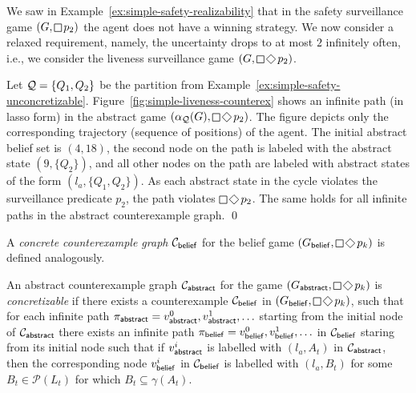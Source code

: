 \begin{example}\label{ex:simple-liveness-counterex}
We saw in Example~\ref{ex:simple-safety-realizability} that in the safety surveillance game $(G,\LTLglobally p_2)$ the agent does not have a winning strategy. %
We now consider a relaxed requirement, namely, the uncertainty drops to at most $2$ infinitely often, i.e., we consider the liveness surveillance game 
$(G,\LTLglobally \LTLfinally p_2)$.

Let $\mathcal{Q} = \{Q_1,Q_2\}$ be the partition from Example~\ref{ex:simple-safety-unconcretizable}. %
Figure~\ref{fig:simple-liveness-counterex} shows an infinite path (in lasso form) in the abstract game $(\alpha_\part(G),\LTLglobally \LTLfinally p_2)$.  The figure depicts only the corresponding trajectory (sequence of positions) of the agent. The initial abstract belief set is $(4,18)$, the second node on the path is labeled with the abstract state $(9,\{Q_2\})$, and all other nodes on the path are labeled with abstract states of the form $(l_a,\{Q_1,Q_2\})$. As each abstract state in the cycle violates the surveillance predicate $p_2$, the path violates $\LTLglobally \LTLfinally p_2$. The same holds for all infinite paths in the abstract counterexample graph.
\qed
\end{example}

A \emph{concrete counterexample graph} $\mathcal{C}_{\mathsf{belief}}$ for the belief game $(G_\belief,\LTLglobally\LTLfinally p_k)$ is defined analogously. 

An abstract counterexample graph $\mathcal{C}_{\mathsf{abstract}}$ for the game $(G_\abstr,\LTLglobally\LTLfinally p_k)$ is \emph{concretizable} if there exists a counterexample
$\mathcal{C}_{\mathsf{belief}}$ in $(G_\belief,\LTLglobally \LTLfinally p_k)$, such that for each infinite path $\pi_{\mathsf{abstract}} = v_{\mathsf{abstract}}^0,v_{\mathsf{abstract}}^1,\ldots$ starting from the initial node of $\mathcal{C}_{\mathsf{abstract}}$ there exists an infinite path $\pi_{\mathsf{belief}} = v_{\mathsf{belief}}^0,v_{\mathsf{belief}}^1,\ldots$ in $\mathcal{C}_{\mathsf{belief}}$ staring from its initial node such that if $v_{\mathsf{abstract}}^i$ is labelled with $(l_a,A_t)$ in $\mathcal{C}_{\mathsf{abstract}}$, then the corresponding node $v_{\mathsf{belief}}^i$ in $\mathcal{C}_{\mathsf{belief}}$ is labelled with $(l_a,B_t)$ for some $B_t \in \mathcal{P}(L_t)$ for which $B_t \subseteq \gamma(A_t)$.

